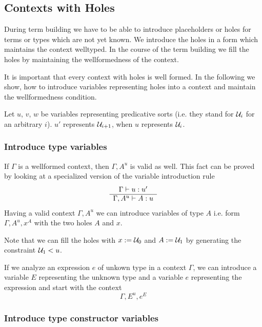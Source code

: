 \subsection{Contexts with Holes}

During term building we have to be able to introduce placeholders or holes for
terms or types which are not yet known. We introduce the holes in a form which
maintains the context welltyped. In the course of the term building we fill the
holes by maintaining the wellformedness of the context.

It is important that every context with holes is well formed. In the following
we show, how to introduce variables representing holes into a context and
maintain the wellformedness condition.

Let $u$, $v$, $w$ be variables representing predicative sorts (i.e. they stand
for ${\cal{U}}_i$ for an arbitrary $i$). $u'$ represents ${\cal{U}}_{i+1}$, when $u$
represents ${\cal{U}}_i$.


\subsubsection{Introduce type variables}

If $\Gamma$ is a wellformed context, then $\Gamma, A^u$ is valid as well. This
fact can be proved by looking at a specialized version of the variable
introduction rule
%
$$
\begin{array}{c} \Gamma \vdash u: u' \\ \hline \Gamma, A^u \vdash A: u\end{array}
$$
%
Having a valid context $\Gamma,A^u$ we can introduce variables of type $A$ i.e.
form $\Gamma, A^u, x^A$ with the two holes $A$ and $x$.

Note that we can fill the holes with $x := {\cal{U}}_0$ and $A := {\cal{U}}_1$ by
generating the constraint ${\cal{U}}_1 < u$.

If we analyze an expression $e$ of unkown type in a context $\Gamma$, we can
introduce a variable $E$ representing the unknown type and a variable $e$
representing the expression and start with the context
%
$$
\Gamma, E^u, e^E
$$




\subsubsection{Introduce type constructor variables}

